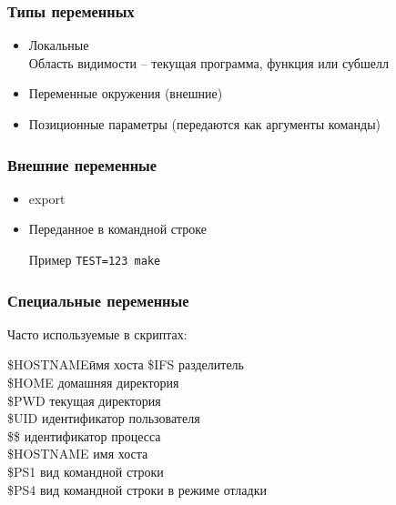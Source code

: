 \begin{frame}
	\frametitle{Типы переменных}
	\begin{itemize}
		\item Локальные\\
		    Область видимости -- текущая программа, функция или субшелл
		\item Переменные окружения (внешние)
		\item Позиционные параметры (передаются как аргументы команды)
	\end{itemize}
\end{frame}

\begin{frame}
	\frametitle{Внешние переменные}


	\begin{itemize}
		\item \alert{export}
		\item Переданное в командной строке \\
			\begin{block}{Пример}
				{\tt TEST=123 make}
			\end{block}
	\end{itemize}
\end{frame}

\begin{frame}[fragile]
	\frametitle{Специальные переменные}
	Часто используемые в скриптах:
\begin{tabbing}
\hspace{1cm}\= \alert{\$HOSTNAME}\quad \= имя хоста\kill
            \> \alert{\$IFS}\quad\> разделитель \\[5pt] 
            \> \alert{\$HOME}\quad \> домашняя директория\\[5pt] 
            \> \alert{\$PWD}\quad \> текущая директория\\[5pt]
            \> \alert{\$UID}\quad \> идентификатор пользователя \\[5pt]
            \> \alert{\$\$}\quad \> идентификатор процесса\\[5pt]
            \> \alert{\$HOSTNAME}\quad \> имя хоста\\[5pt]
            \> \alert{\$PS1}\quad \> вид командной строки\\[5pt]
            \> \alert{\$PS4}\quad \> вид командной строки в режиме отладки
\end{tabbing}

    
\end{frame}


